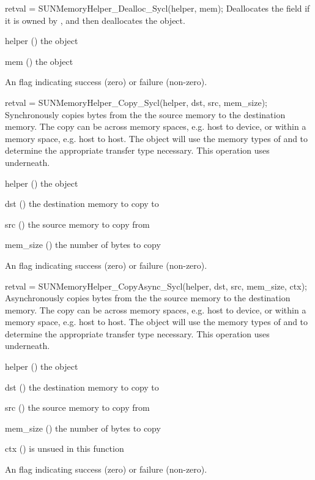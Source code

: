 {
  retval = SUNMemoryHelper\_Dealloc\_Sycl(helper, mem);
}
{
  Deallocates the  field if it is owned by , and then
  deallocates the  object.
}
{
  \begin{args}[helper]
  \item[helper] () the  object
  \item[mem] () the  object
  \end{args}
}
{
  An  flag indicating success (zero) or failure (non-zero).
}
{}

{
  retval = SUNMemoryHelper\_Copy\_Sycl(helper, dst, src, mem\_size);
}
{
  Synchronously copies  bytes from the the source memory to the
  destination memory.  The copy can be across memory spaces, e.g. host to
  device, or within a memory space, e.g. host to host. The 
  object will use the memory types of  and  to determine
  the appropriate transfer type necessary.
}
{
  This operation uses  underneath.
}
{
  \begin{args}
  \item[helper] () the  object
  \item[dst] () the destination memory to copy to
  \item[src] () the source memory to copy from
  \item[mem\_size] () the number of bytes to copy
  \end{args}
}
{
  An  flag indicating success (zero) or failure (non-zero).
}
{}

{
  retval = SUNMemoryHelper\_CopyAsync\_Sycl(helper, dst, src, mem\_size, ctx);
}
{
  Asynchronously copies  bytes from the the source memory to the
  destination memory.  The copy can be across memory spaces, e.g. host to
  device, or within a memory space, e.g. host to host. The 
  object will use the memory types of  and  to determine
  the appropriate transfer type necessary.
}
{
  This operation uses  underneath.
}
{
  \begin{args}
  \item[helper] () the  object
  \item[dst] () the destination memory to copy to
  \item[src] () the source memory to copy from
  \item[mem\_size] () the number of bytes to copy
  \item[ctx] () is unsued in this function
  \end{args}
}
{
  An  flag indicating success (zero) or failure (non-zero).
}
{}
